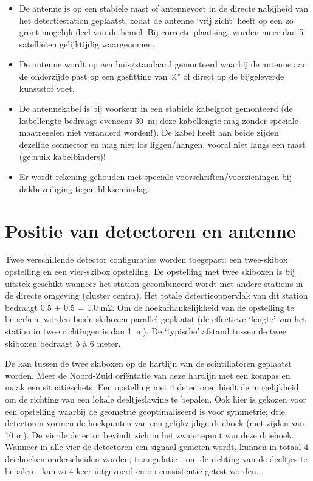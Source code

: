 \begin{itemize}
    zijn bij voorkeur in vast gemonteerde stabiele
    (metalen/kunststoffen) kabelgoten/buizen ondergebracht (de
    voedingsspanning van de fotobuis bedraagt \SI{12}{\volt} met beperkte
    belastbaarheid). Voorkom kortsluiting; bescherm de connectors
    tegen mechanische belasting en inwerking van vocht en voorkom
    scherpe knikken in de kabels!
    \item De \gps antenne is op een stabiele mast of antennevoet in de
    directe nabijheid van het detectiestation geplaatst, zodat de
    antenne ‘vrij zicht’ heeft op een zo groot mogelijk deel van de
    hemel. Bij correcte plaatsing, worden meer dan 5 satellieten
    gelijktijdig waargenomen.
    \item De \gps antenne wordt op een buis/standaard gemonteerd waarbij
    de antenne aan de onderzijde past op een gasfitting van 3⁄4" of
    direct op de bijgeleverde kunststof voet.
    \item De \gps antennekabel is bij voorkeur in een stabiele kabelgoot
    gemonteerd (de \gps kabellengte bedraagt eveneens \SI{30}{\meter};
    deze kabellengte mag zonder speciale maatregelen niet veranderd
    worden!). De kabel heeft aan beide zijden dezelfde connector en mag
    niet los liggen/hangen, vooral niet langs een mast (gebruik
    kabelbinders)!
    \item Er wordt rekening gehouden met speciale
    voorschriften/voorzieningen bij dakbeveiliging tegen blikseminslag.
\end{itemize}


\section{Positie van detectoren en \gps antenne}

Twee verschillende \hisparc detector configuraties worden toegepast; een
twee-skibox opstelling en een vier-skibox opstelling. De opstelling met
twee skiboxen is bij uitstek geschikt wanneer het station gecombineerd
wordt met andere stations in de directe omgeving (cluster centra). Het
totale detectieoppervlak van dit station bedraagt 0.5 + 0.5 = 1.0 m2. Om
de hoekafhankelijkheid van de opstelling te beperken, worden beide
skiboxen parallel geplaatst (de effectieve ‘lengte’ van het station in
twee richtingen is dan \SI{1}{\meter}). De ‘typische’ afstand tussen de
twee skiboxen bedraagt 5 à 6 meter.

De \gps kan tussen de twee skiboxen op de hartlijn van de scintillatoren
geplaatst worden. Meet de Noord-Zuid oriëntatie van deze
hartlijn met een kompas en maak een situatieschets. Een opstelling met 4
detectoren biedt de mogelijkheid om de richting van een lokale
deeltjeslawine te bepalen. Ook hier is gekozen voor een opstelling
waarbij de geometrie geoptimaliseerd is voor symmetrie; drie
detectoren vormen de hoekpunten van een gelijkzijdige driehoek (met
zijden van 10 m). De vierde detector bevindt zich in het zwaartepunt van
deze driehoek. Wanneer in alle vier de detectoren een signaal gemeten
wordt, kunnen in totaal 4 driehoeken onderscheiden worden; triangulatie
- om de richting van de deeltjes te bepalen - kan zo 4 keer uitgevoerd
en op consistentie getest worden...

